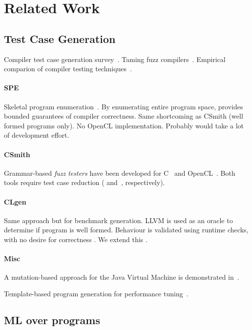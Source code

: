 \section{Related Work}\label{sec:rw}

\subsection{Test Case Generation}

 Compiler test case generation survey~\cite{Boujarwah1997}. Taming fuzz compilers~\cite{Chen2013}. Empirical comparion of compiler testing techniques~\cite{Chen2014a}.

\paragraph{SPE} Skeletal program enumeration~\cite{Zhang2016a}. By enumerating entire program space, provides bounded guarantees of compiler correctness. Same shortcoming as CSmith (well formed programs only). No OpenCL implementation. Probably would take a lot of development effort. 

\paragraph{CSmith} Grammar-based \emph{fuzz testers} have been developed for C~\cite{Yang2011} and OpenCL~\cite{Lidbury2015a}. Both tools require test case reduction (\cite{Regehr2012a} and~\cite{Pflanzer2016}, respectively).

\paragraph{CLgen} Same approach but for benchmark generation. LLVM is used as an oracle to determine if program is well formed. Behaviour is validated using runtime checks, with no desire for correctness \cite{Cummins2017a}. We extend this \cc{\ldots}.

\paragraph{Misc} A mutation-based approach for the Java Virtual Machine is demonstrated in~\cite{Chena}.

Template-based program generation for performance tuning~\cite{Han2017}.

\subsection{ML over programs} 

